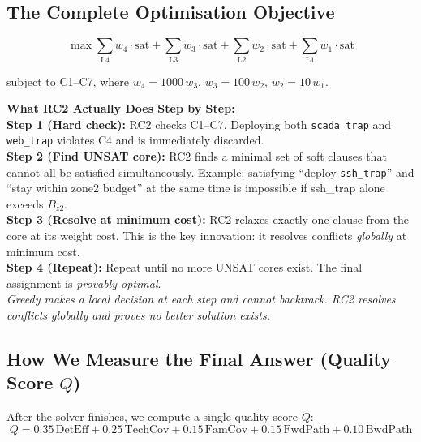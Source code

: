 \documentclass[journal]{IEEEtran}
\begin{document}
\subsection{The Complete Optimisation Objective}

\begin{equation}
\max \sum_{\text{L4}} w_4 \cdot \mathrm{sat}
   + \sum_{\text{L3}} w_3 \cdot \mathrm{sat}
   + \sum_{\text{L2}} w_2 \cdot \mathrm{sat}
   + \sum_{\text{L1}} w_1 \cdot \mathrm{sat}
\end{equation}

subject to C1--C7, where
$w_4 = 1000\,w_3$, $w_3 = 100\,w_2$, $w_2 = 10\,w_1$.

\begin{examplebox}
\textbf{What RC2 Actually Does Step by Step:}\\[3pt]
\textbf{Step 1 (Hard check):} RC2 checks C1--C7.
Deploying both \texttt{scada\_trap} and \texttt{web\_trap}
violates C4 and is immediately discarded.\\
\textbf{Step 2 (Find UNSAT core):} RC2 finds a minimal set
of soft clauses that cannot all be satisfied simultaneously.
Example: satisfying ``deploy \texttt{ssh\_trap}'' and
``stay within zone2 budget'' at the same time is impossible
if ssh\_trap alone exceeds $B_{z2}$.\\
\textbf{Step 3 (Resolve at minimum cost):} RC2 relaxes
exactly one clause from the core at its weight cost.
This is the key innovation: it resolves conflicts
\emph{globally} at minimum cost.\\
\textbf{Step 4 (Repeat):} Repeat until no more UNSAT
cores exist.
The final assignment is \emph{provably optimal}.\\[3pt]
\textit{Greedy makes a local decision at each step and cannot
backtrack.
RC2 resolves conflicts globally and proves no better solution
exists.}
\end{examplebox}

\subsection{How We Measure the Final Answer (Quality Score
$Q$)}

After the solver finishes, we compute a single quality
score $Q$:
\begin{equation}
  Q = 0.35\,\text{DetEff} + 0.25\,\text{TechCov}
    + 0.15\,\text{FamCov} + 0.15\,\text{FwdPath}
    + 0.10\,\text{BwdPath}
\end{equation}
\end{document}
